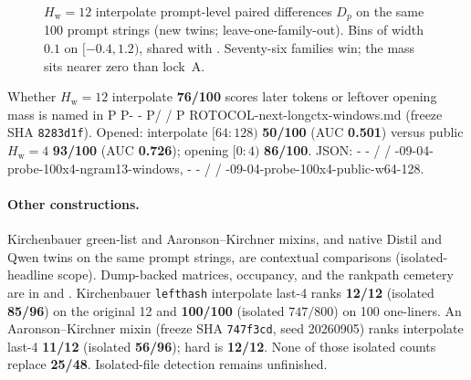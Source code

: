 \documentclass[11pt,a4paper]{article}
\makeatletter
\newcommand{\ttfile}[1]{\bgroup\ttfamily\ttfile@scan#1\relax\egroup}
\def\ttfile@scan#1{%
  \ifx#1\relax
  \else
    \ifx#1-%
      -\penalty0 %
    \else
      \ifx#1/%
        /\penalty0 %
      \else
        #1%
      \fi
    \fi
    \expandafter\ttfile@scan
  \fi}
\theoremstyle{definition}
\newcommand{\Hw}{H_{\mathrm{w}}}
\makeatother
\begin{document}
\begin{figure}[ht]
\centering
{}
\caption{$\Hw=12$ interpolate prompt-level paired differences $D_p$ on
the same 100 prompt strings (new twins; leave-one-family-out). Bins of
width $0.1$ on $[-0.4,1.2)$, shared with .
Seventy-six families win; the mass sits nearer zero than lock~A.}
\label{fig:hw12}
\end{figure}


Whether $\Hw=12$ interpolate \textbf{76/100} scores later tokens or
leftover opening mass is named in
\ttfile{PROTOCOL-next-longctx-windows.md}
(freeze SHA \texttt{8283d1f}).
Opened: interpolate $[64{:}128)$ \textbf{50/100} (AUC \textbf{0.501})
versus public $\Hw=4$ \textbf{93/100} (AUC \textbf{0.726});
opening $[0{:}4)$ \textbf{86/100}.
JSON:
\ttfile{2026-09-04-probe-100x4-ngram13-windows},
\ttfile{2026-09-04-probe-100x4-public-w64-128}.


\paragraph{Other constructions.}
Kirchenbauer green-list and Aaronson--Kirchner mixins, and native Distil
and Qwen twins on the same prompt strings, are contextual comparisons
(isolated-headline scope). Dump-backed matrices, occupancy, and the
rankpath cemetery are in  and
.
Kirchenbauer \texttt{lefthash} interpolate last-4 ranks \textbf{12/12}
(isolated \textbf{85/96}) on the original 12 and \textbf{100/100}
(isolated $747/800$) on 100 one-liners. An Aaronson--Kirchner mixin
(freeze SHA \texttt{747f3cd}, seed 20260905) ranks interpolate last-4
\textbf{11/12} (isolated \textbf{56/96}); hard is \textbf{12/12}. None
of those isolated counts replace \textbf{25/48}. Isolated-file
detection remains unfinished.
\end{document}
